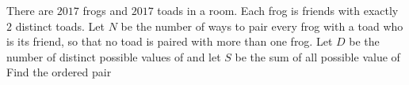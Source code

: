 There are $2017$ frogs and $2017$ toads in a room. Each frog is friends with exactly $2$ distinct toads. Let $N$ be the number of ways to pair every frog with a toad who is its friend, so that no toad is paired with more than one frog. Let $D$ be the number of distinct possible values of  and let $S$ be the sum of all possible value of  Find the ordered pair 